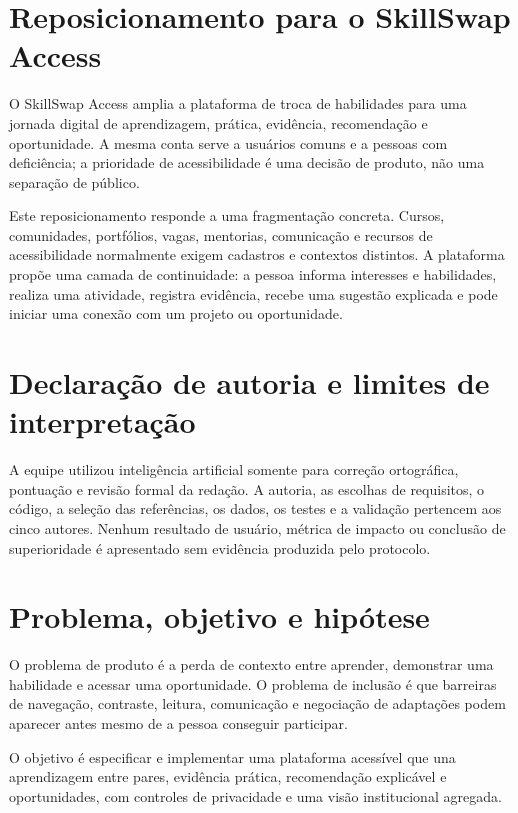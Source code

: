 \section{Reposicionamento para o SkillSwap Access}

O SkillSwap Access amplia a plataforma de troca de habilidades para uma jornada digital de aprendizagem, prática, evidência, recomendação e oportunidade. A mesma conta serve a usuários comuns e a pessoas com deficiência; a prioridade de acessibilidade é uma decisão de produto, não uma separação de público.

Este reposicionamento responde a uma fragmentação concreta. Cursos, comunidades, portfólios, vagas, mentorias, comunicação e recursos de acessibilidade normalmente exigem cadastros e contextos distintos. A plataforma propõe uma camada de continuidade: a pessoa informa interesses e habilidades, realiza uma atividade, registra evidência, recebe uma sugestão explicada e pode iniciar uma conexão com um projeto ou oportunidade.

\section{Declaração de autoria e limites de interpretação}

A equipe utilizou inteligência artificial somente para correção ortográfica, pontuação e revisão formal da redação. A autoria, as escolhas de requisitos, o código, a seleção das referências, os dados, os testes e a validação pertencem aos cinco autores. Nenhum resultado de usuário, métrica de impacto ou conclusão de superioridade é apresentado sem evidência produzida pelo protocolo.

\section{Problema, objetivo e hipótese}

O problema de produto é a perda de contexto entre aprender, demonstrar uma habilidade e acessar uma oportunidade. O problema de inclusão é que barreiras de navegação, contraste, leitura, comunicação e negociação de adaptações podem aparecer antes mesmo de a pessoa conseguir participar.

O objetivo é especificar e implementar uma plataforma acessível que una aprendizagem entre pares, evidência prática, recomendação explicável e oportunidades, com controles de privacidade e uma visão institucional agregada.

